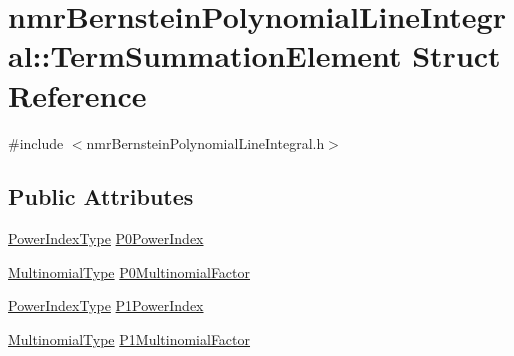\hypertarget{structnmr_bernstein_polynomial_line_integral_1_1_term_summation_element}{\section{nmr\-Bernstein\-Polynomial\-Line\-Integral\-:\-:Term\-Summation\-Element Struct Reference}
\label{structnmr_bernstein_polynomial_line_integral_1_1_term_summation_element}
}


{\ttfamily \#include $<$nmr\-Bernstein\-Polynomial\-Line\-Integral.\-h$>$}

\subsection*{Public Attributes}
\begin{DoxyCompactItemize}
\item 
\hyperlink{classnmr_bernstein_polynomial_line_integral_a16dae5a5a7adabc4c3356c857aeb3841}{Power\-Index\-Type} \hyperlink{structnmr_bernstein_polynomial_line_integral_1_1_term_summation_element_a3f22a71b47cf410589d11cffe810ac99}{P0\-Power\-Index}
\item 
\hyperlink{classnmr_bernstein_polynomial_line_integral_a284a932e77c5c38a5d6959c4992d5300}{Multinomial\-Type} \hyperlink{structnmr_bernstein_polynomial_line_integral_1_1_term_summation_element_a7ebc3563775007a6e90af478c2220444}{P0\-Multinomial\-Factor}
\item 
\hyperlink{classnmr_bernstein_polynomial_line_integral_a16dae5a5a7adabc4c3356c857aeb3841}{Power\-Index\-Type} \hyperlink{structnmr_bernstein_polynomial_line_integral_1_1_term_summation_element_a3eca58974e87a3625ec449a076fed408}{P1\-Power\-Index}
\item 
\hyperlink{classnmr_bernstein_polynomial_line_integral_a284a932e77c5c38a5d6959c4992d5300}{Multinomial\-Type} \hyperlink{structnmr_bernstein_polynomial_line_integral_1_1_term_summation_element_a870017786f9f1cf36bfea177572de31a}{P1\-Multinomial\-Factor}
\end{DoxyCompactItemize}


